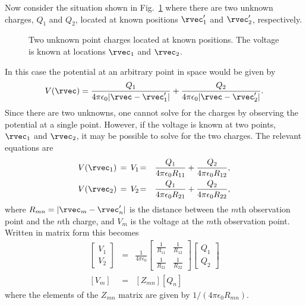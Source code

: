 Now consider the situation shown in Fig.\ \ref{fig:doubleCharge} where
there are two unknown charges, $Q_1$ and $Q_2$, located at known
positions $\rvec_1'$ and $\rvec_2'$, respectively.
\begin{figure}
  \begin{center}
  \end{center}
  \caption{Two unknown point charges located at known positions.  The
    voltage is known at locations $\rvec_1$ and $\rvec_2$.}
  \label{fig:doubleCharge}
\end{figure}
In this case the potential at an arbitrary point in space would be
given by
\begin{equation}
  V(\rvec) = \frac{Q_1}{4 \pi \epsilon_0|\rvec-\rvec_1'|} 
        + \frac{Q_2}{4 \pi \epsilon_0|\rvec-\rvec_2'|}.
  \label{eq:twoCharges}
\end{equation}
Since there are two unknowns, one cannot solve for the charges by
observing the potential at a single point.  However, if the voltage is
known at two points, $\rvec_1$ and $\rvec_2$, it may be possible to solve
for the two charges.  The relevant equations are
\begin{eqnarray}
  V(\rvec_1) \,=\, V_1 \!&=& \frac{Q_1}{4 \pi \epsilon_0R_{11}} 
              + \frac{Q_2}{4 \pi \epsilon_0R_{12}}, \\
  V(\rvec_2) \,=\, V_2 \!&=& \frac{Q_1}{4 \pi \epsilon_0R_{21}} 
              + \frac{Q_2}{4 \pi \epsilon_0R_{22}},
\end{eqnarray}
where $R_{mn}=|\rvec_m-\rvec_n'|$ is the distance between the $m$th
observation point and the $n$th charge, and $V_m$ is the voltage at the
$m$th observation point.  Written in matrix form this becomes
\begin{eqnarray}
  \left[
   \begin{array}{c}
      V_1 \\
      V_2 
   \end{array}
  \right] &=& 
  \frac{1}{4\pi\epsilon_0}
  \left[
    \begin{array}{cc}
      \frac{1}{R_{11}} & \frac{1}{R_{12}} \\
      \frac{1}{R_{21}} & \frac{1}{R_{22}}
    \end{array}
  \right]
  \left[
    \begin{array}{c}
      Q_1 \\
      Q_2 
    \end{array}
  \right] \\
  \left[V_m\right] &=& \left[Z_{mn}\right] \left[Q_n\right]
\end{eqnarray}
where the elements of the $Z_{mn}$ matrix are given by
$1/(4\pi\epsilon_0 R_{mn})$.

